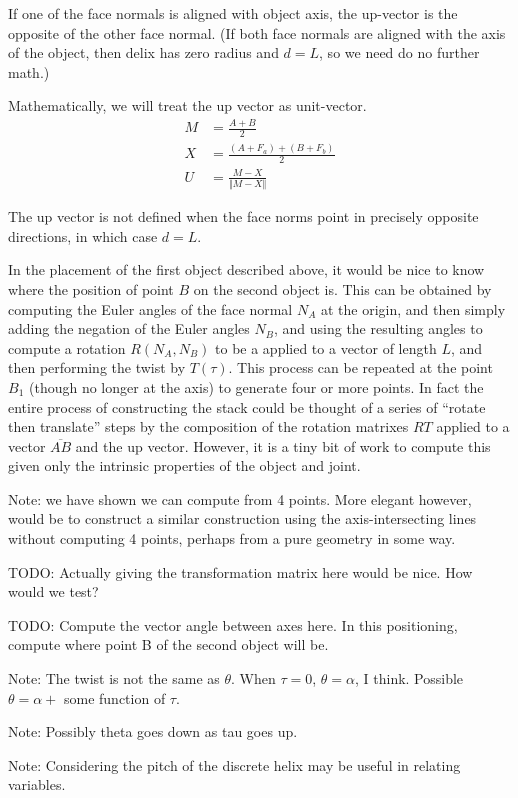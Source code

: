 \documentclass[11pt]{article}
\begin{document}
If one of the face normals is aligned with object axis, the up-vector is the opposite
of the other face normal. (If both face normals are aligned with the axis of the object,
then delix has zero radius and $d = L$, so we need do no further math.)

Mathematically, we will treat the up vector as unit-vector.
\begin{align}
  M &= \frac{A+B}{2} \\
  X &= \frac{(A+F_a) + (B+F_b)}{2} \\
  U &= \frac{M - X}{\Vert M - X \Vert}
\end{align}

The up vector is not defined when the face norms point in precisely opposite directions,
in which case $d = L$.

In the placement of the first object described above, it would
be nice to know where the position of point $B$ on the second
object is. This can be obtained by computing the Euler angles
of the face normal $N_A$ at the origin, and then simply
adding the negation of the Euler angles $N_B$, and using
the resulting angles to compute a rotation $R(N_A,N_B)$ to be a applied to
a vector of length $L$, and then performing the twist by $T(\tau)$. This process can be repeated at
the point $B_1$ (though no longer at the axis) to generate
four or more points. In fact the entire process of constructing
the stack could be thought of a series of ``rotate then translate'' steps by the composition of the rotation matrixes $RT$ applied to a vector $\overline{AB}$ and the up vector.
However, it is a tiny bit of work to compute this given only
the intrinsic properties of the object and joint.

Note: we have shown we can compute from 4 points.
More elegant however, would be to construct a similar
construction using the axis-intersecting lines without
computing 4 points, perhaps from a pure geometry in some way.

TODO: Actually giving the transformation matrix here would be nice.
How would we test? 

TODO: Compute the vector angle between axes here. In this positioning, compute where
point B of the second object will be.

Note: The twist is not the same as $\theta$. When $\tau = 0$, $\theta = \alpha$,
I think. Possible $\theta = \alpha + $ some function of $\tau$.

Note: Possibly theta goes down as tau goes up.

Note: Considering the pitch of the discrete helix may be useful
in relating variables.
\end{document}
